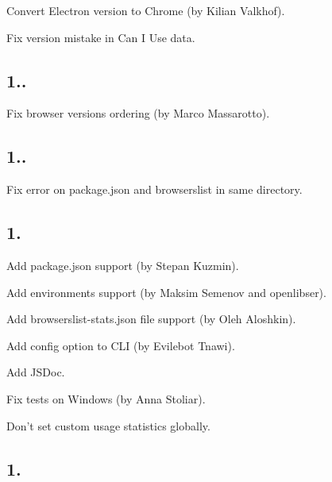 \begin{DoxyItemize}
\item Convert Electron version to Chrome (by Kilian Valkhof).
\item Fix {} version mistake in Can I Use data.
\end{DoxyItemize}

\subsection*{1..}


\begin{DoxyItemize}
\item Fix browser versions ordering (by Marco Massarotto).
\end{DoxyItemize}

\subsection*{1..}


\begin{DoxyItemize}
\item Fix error on {\ttfamily package.\+json} and {\ttfamily browserslist} in same directory.
\end{DoxyItemize}

\subsection*{1.}


\begin{DoxyItemize}
\item Add {\ttfamily package.\+json} support (by Stepan Kuzmin).
\item Add environments support (by Maksim Semenov and openlibser).
\item Add {\ttfamily browserslist-\/stats.\+json} file support (by Oleh Aloshkin).
\item Add {\ttfamily config} option to C\+LI (by Evilebot Tnawi).
\item Add J\+S\+Doc.
\item Fix tests on Windows (by Anna Stoliar).
\item Don’t set custom usage statistics globally.
\end{DoxyItemize}

\subsection*{1.}


